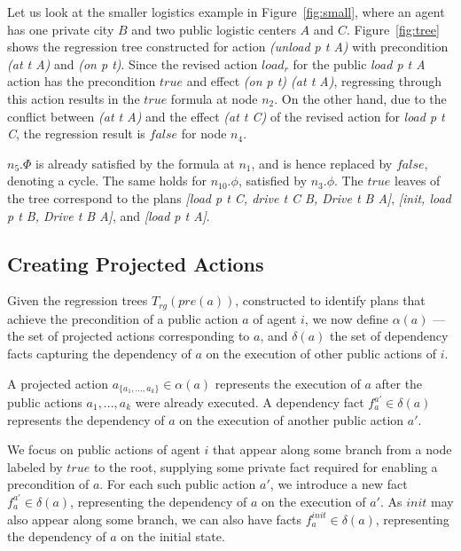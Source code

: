 \documentclass[letterpaper]{article}
\theoremstyle{definition}
\newtheorem{example}{Example}[section]
\begin{document}
Let us look at the smaller logistics example in Figure~\ref{fig:small}, where an agent has one private city $B$ and two public logistic centers $A$ and $C$. Figure~\ref{fig:tree} shows the regression tree constructed for  action {\em (unload p t A)} with precondition {\em(at t A)} and {\em(on p t)}. %
Since the revised action $load_r$ for the public {\em load p t A} action has the precondition $true$ and effect {\em (on p t) (at t A)}, regressing through this action results in the $true$ formula at node $n_2$. On the other hand, due to the conflict between {\em (at t A)} and the effect {\em (at t C)} of the revised action for {\em load p t C}, the regression result is $false$ for node $n_4$.

$n_5.\Phi$ is already satisfied by the formula at $n_1$, and is hence replaced by $false$, denoting a cycle. The same holds for $n_{10}.\phi$, satisfied by $n_3.\phi$. The $true$ leaves of the tree correspond to the plans {\em [load p t C, drive t C B, Drive t B A]},  {\em [init, load p t B, Drive t B A]}, and {\em [load p t A]}. 

\subsection{Creating Projected Actions}

Given the regression trees $T_{rg}(pre(a))$, constructed to identify plans that achieve the precondition of a public action $a$ of agent $i$, we now define $\alpha(a)$ --- the set of projected actions corresponding to $a$, and $\delta(a)$ the set of dependency facts capturing the dependency of $a$ on the execution of other public actions of $i$. 

A projected action $a_{\{a_1,...,a_k\}}\in \alpha(a)$ represents the execution of $a$ after the public actions $a_1,...,a_k$ were already executed. A dependency fact $f^{a'}_a \in \delta(a)$ represents the dependency of $a$ on the execution of another public action $a'$.

We focus on public actions of agent $i$ that appear along some branch from a node labeled by $true$ to the root, supplying some private fact required for enabling a precondition of $a$. For each such public action $a'$, we introduce a new fact $f^{a'}_a \in \delta(a)$, representing the dependency of $a$ on the execution of $a'$. As $init$ may also appear along some branch, we can also have facts $f^{init}_a \in \delta(a)$, representing the dependency of $a$ on the initial state. 
\end{document}
